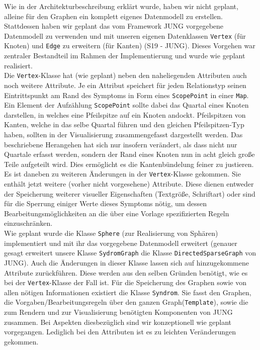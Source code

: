 \documentclass[enabledeprecatedfontcommands,fontsize=11pt,paper=a4,twoside]{scrartcl}
\newcounter{one}
\begin{document}
Wie in der Architekturbeschreibung erklärt wurde, haben wir nicht geplant, alleine für den Graphen ein komplett eigenes Datenmodell zu erstellen. Stattdessen haben wir geplant das vom Framework JUNG vorgegebene Datenmodell zu verwenden und mit unseren eigenen Datenklassen \texttt{Vertex} (für Knoten) und \texttt{Edge} zu erweitern (für Kanten) (S19 - JUNG). Dieses Vorgehen war zentraler Bestandteil im Rahmen der Implementierung und wurde wie geplant realisiert.\\ 
Die \texttt{Vertex}-Klasse hat (wie geplant) neben den naheliegenden Attributen auch noch weitere Attribute. Je ein Attribut speichert für jeden Relationstyp seinen Eintrittspunkt am Rand des Symptoms in Form eines \texttt{ScopePoint} in einer \texttt{Map}. Ein Element der Aufzählung \texttt{ScopePoint} sollte dabei das Quartal eines Knoten darstellen, in welches eine Pfeilspitze auf ein Knoten andockt. Pfeilspitzen von Kanten, welche in das selbe Quartal führen und den gleichen Pfeilspitzen-Typ haben, sollten in der Visualisierung zusammengefasst dargestellt werden. Das beschriebene Herangehen hat sich nur insofern verändert, als dass nicht nur Quartale erfasst werden, sondern der Rand eines Knoten nun in acht gleich große Teile aufgeteilt wird. Dies ermöglicht es die Kantenbündelung feiner zu justieren. Es ist daneben zu weiteren Änderungen in der \texttt{Vertex}-Klasse gekommen. Sie enthält jetzt weitere (vorher nicht vorgesehene) Attribute. Diese dienen entweder der Speicherung weiterer visueller Eigenschaften (Textgröße, Schriftart) oder sind für die Sperrung einiger Werte dieses Symptoms nötig, um dessen Bearbeitungsmöglichkeiten an die über eine Vorlage spezifizierten Regeln einzuschränken.\\

Wie geplant wurde die Klasse \texttt{Sphere} (zur Realisierung von Sphären) implementiert und mit ihr das vorgegebene Datenmodell erweitert (genauer gesagt erweitert unsere Klasse \texttt{SydromGraph} die Klasse \texttt{DirectedSparseGraph} von JUNG). Auch die Änderungen in dieser Klasse lassen sich auf hinzugekommene Attribute zurückführen. Diese werden aus den selben Gründen benötigt, wie es bei der \texttt{Vertex}-Klasse der Fall ist.
Für die Speicherung des Graphen sowie von allen nötigen Informationen existiert die Klasse \texttt{Syndrom}. Sie fasst den Graphen, die Vorgaben/Bearbeitungsregeln über den ganzen Graph(\texttt{Template}), sowie die zum Rendern und zur Visualisierung benötigten Komponenten von JUNG zusammen. Bei Aspekten diesbezüglich sind wir konzeptionell wie geplant vorgegangen. Lediglich bei den Attributen ist es zu leichten Veränderungen gekommen.\\ 
\end{document}
